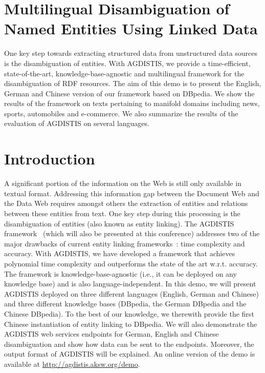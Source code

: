 


\section{Multilingual Disambiguation of Named Entities Using Linked Data}




One key step towards extracting structured data from unstructured data sources is the disambiguation of entities.
With AGDISTIS, we provide a time-efficient, state-of-the-art, knowledge-base-agnostic and multilingual framework for the disambiguation of RDF resources.
The aim of this demo is to present the English, German and Chinese version of our framework based on DBpedia.
We show the results of the framework on texts pertaining to manifold domains including news, sports, automobiles and e-commerce.
We also summarize the results of the evaluation of AGDISTIS on several languages.

\section{Introduction}
A significant portion of the information on the Web is still only available in textual format. 
Addressing this information gap between the Document Web and the Data Web requires amongst others the extraction of entities and relations between these entities from text.
One key step during this processing is the disambiguation of entities (also known as entity linking).
The AGDISTIS framework~\cite{agdistis_iswc} (which will also be presented at this conference) addresses two of the major drawbacks of current entity linking frameworks~\cite{TagMe2,spotlight,babelfy}: time complexity and accuracy.
With AGDISTIS, we have developed a framework that achieves polynomial time complexity and outperforms the state of the art w.r.t. accuracy.
The framework is knowledge-base-agnostic (i.e., it can be deployed on any knowledge base) and is also language-independent.
In this demo, we will present AGDISTIS deployed on three different languages (English, German and Chinese) and three different knowledge bases (DBpedia, the German DBpedia and the Chinese DBpedia).
To the best of our knowledge, we therewith provide the first Chinese instantiation of entity linking to DBpedia.
We will also demonstrate the AGDISTIS web services endpoints for German, English and Chinese disambiguation and show how data can be sent to the endpoints.
Moreover, the output format of AGDISTIS will be explained.
An online version of the demo is available at \url{http://agdistis.aksw.org/demo}.

